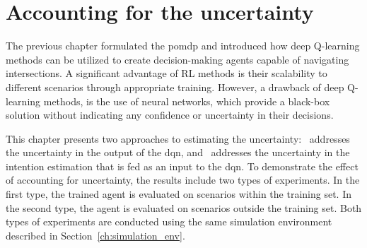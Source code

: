 \chapter{Accounting for the uncertainty}\label{ch:uncertainty}

The previous chapter formulated the \gls{pomdp} and introduced how deep Q-learning methods can be utilized to create decision-making agents capable of navigating intersections. A significant advantage of RL methods is their scalability to different scenarios through appropriate training. However, a drawback of deep Q-learning methods, is the use of neural networks, which provide a black-box solution without indicating any confidence or uncertainty in their decisions.

This chapter presents two approaches to estimating the uncertainty: \paperEnsamble \ addresses the uncertainty in the output of the \gls{dqn}, and \paperBelief \ addresses the uncertainty in the intention estimation that is fed as an input to the \gls{dqn}.
To demonstrate the effect of accounting for uncertainty, the results include two types of experiments. In the first type, the trained agent is evaluated on scenarios within the training set. In the second type, the agent is evaluated on scenarios outside the training set. Both types of experiments are conducted using the same simulation environment described in Section~\ref{ch:simulation_env}.

